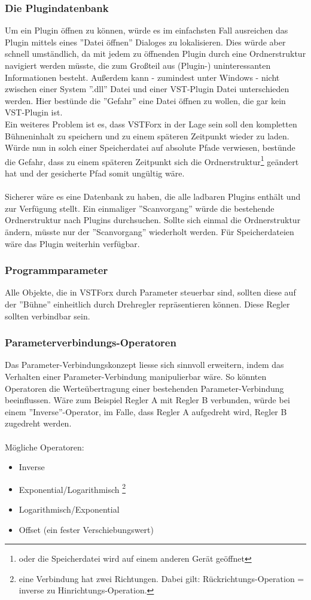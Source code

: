 \subsubsection{\label{pdb}Die Plugindatenbank}
Um ein Plugin öffnen zu können, würde es im einfachsten Fall ausreichen das Plugin mittels eines ''Datei öffnen'' Dialoges zu lokalisieren.
Dies würde aber schnell umständlich, da mit jedem zu öffnenden Plugin durch eine Ordnerstruktur navigiert werden müsste, die zum Großteil aus (Plugin-) uninteressanten Informationen besteht. Außerdem kann - zumindest unter Windows - nicht zwischen einer System ''.dll'' Datei und einer VST-Plugin Datei unterschieden werden. Hier bestünde die ''Gefahr'' eine Datei öffnen zu wollen, die gar kein VST-Plugin ist.\\
Ein weiteres Problem ist es, dass VSTForx in der Lage sein soll den kompletten Bühneninhalt zu speichern und zu einem späteren Zeitpunkt wieder zu laden. Würde nun in solch einer Speicherdatei auf absolute Pfade verwiesen, bestünde die Gefahr, dass zu einem späteren Zeitpunkt sich die Ordnerstruktur\footnote{oder die Speicherdatei wird auf einem anderen Gerät geöffnet} geändert hat und der gesicherte Pfad somit ungültig wäre.
\\\\
Sicherer wäre es eine Datenbank zu haben, die alle ladbaren Plugins enthält und zur Verfügung stellt. Ein einmaliger ''Scanvorgang'' würde die bestehende Ordnerstruktur nach Plugins durchsuchen. Sollte sich einmal die Ordnerstruktur ändern, müsste nur der ''Scanvorgang'' wiederholt werden. Für Speicherdateien wäre das Plugin weiterhin verfügbar.
\subsubsection{Programmparameter}
Alle Objekte, die in VSTForx durch Parameter steuerbar sind, sollten diese auf der ''Bühne'' einheitlich durch Drehregler repräsentieren können. Diese Regler sollten verbindbar sein. 

\subsubsection{Parameterverbindungs-Operatoren}
Das Parameter-Verbindungskonzept liesse sich sinnvoll erweitern, indem das Verhalten einer Parameter-Verbindung manipulierbar wäre. So könnten Operatoren die Werteübertragung einer bestehenden Parameter-Verbindung beeinflussen.
Wäre zum Beispiel Regler A mit Regler B verbunden, würde bei einem ''Inverse''-Operator, im Falle, dass Regler A aufgedreht wird, Regler B zugedreht werden.
\\\\
Mögliche Operatoren:
\begin{itemize}
	\item Inverse
	\item Exponential/Logarithmisch \footnote{eine Verbindung hat zwei Richtungen. Dabei gilt: Rückrichtungs-Operation = inverse zu Hinrichtungs-Operation.}
	\item Logarithmisch/Exponential
	\item Offset (ein fester Verschiebungswert)
\end{itemize}
